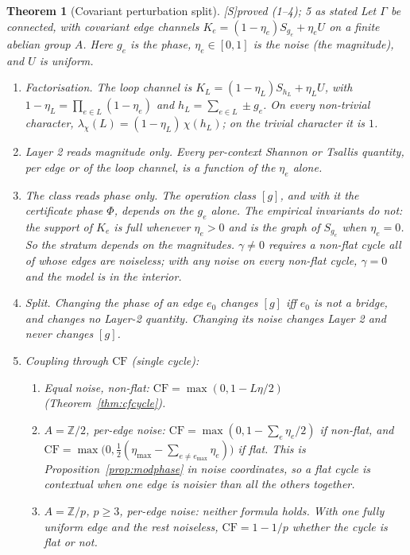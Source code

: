 \documentclass[11pt]{article}
\newtheorem{theorem}{Theorem}[section]
\theoremstyle{definition}
\theoremstyle{remark}
\newcommand{\Z}{\mathbb{Z}}
\newcommand{\CF}{\mathrm{CF}}
\newcommand{\src}[1]{\textsf{\small[#1]}}
\newcommand{\st}[1]{\textsf{\small\color{gray}#1}}
\begin{document}
\begin{theorem}[Covariant perturbation split]\label{thm:split}\src{S}\st{proved (1--4); 5 as stated}
Let $\Gamma$ be connected, with covariant edge channels $K_e=(1-\eta_e)S_{g_e}+\eta_eU$ on a finite abelian group $A$. Here $g_e$ is the \emph{phase}, $\eta_e\in[0,1]$ is the \emph{noise} (the magnitude), and $U$ is uniform.
\begin{enumerate}
  \item \emph{Factorisation.} The loop channel is $K_L=(1-\eta_L)S_{h_L}+\eta_LU$, with $1-\eta_L=\prod_{e\in L}(1-\eta_e)$ and $h_L=\sum_{e\in L}\pm g_e$. On every \emph{non-trivial} character, $\lambda_\chi(L)=(1-\eta_L)\,\chi(h_L)$; on the trivial character it is $1$.
  \item \emph{Layer 2 reads magnitude only.} Every per-context Shannon or Tsallis quantity, per edge or of the loop channel, is a function of the $\eta_e$ alone.
  \item \emph{The class reads phase only.} The operation class $[g]$, and with it the certificate phase $\Phi$, depends on the $g_e$ alone. The \emph{empirical} invariants do not: the support of $K_e$ is full whenever $\eta_e>0$ and is the graph of $S_{g_e}$ when $\eta_e=0$. So the stratum depends on the magnitudes. $\gamma\neq0$ requires a non-flat cycle all of whose edges are noiseless; with any noise on every non-flat cycle, $\gamma=0$ and the model is in the interior.
  \item \emph{Split.} Changing the phase of an edge $e_0$ changes $[g]$ iff $e_0$ is not a bridge, and changes no Layer-2 quantity. Changing its noise changes Layer 2 and never changes $[g]$.
  \item \emph{Coupling through $\CF$} (single cycle):
  \begin{enumerate}
    \item[(a)] Equal noise, non-flat: $\CF=\max(0,1-L\eta/2)$ (Theorem~\ref{thm:cfcycle}).
    \item[(b)] $A=\Z/2$, per-edge noise: $\CF=\max(0,1-\sum_e\eta_e/2)$ if non-flat, and $\CF=\max\bigl(0,\tfrac12(\eta_{\max}-\sum_{e\neq e_{\max}}\eta_e)\bigr)$ if flat. This is Proposition~\ref{prop:modphase} in noise coordinates, so a \emph{flat} cycle is contextual when one edge is noisier than all the others together.
    \item[(c)] $A=\Z/p$, $p\ge3$, per-edge noise: neither formula holds. With one fully uniform edge and the rest noiseless, $\CF=1-1/p$ whether the cycle is flat or not.
  \end{enumerate}
\end{enumerate}
\end{theorem}
\end{document}
